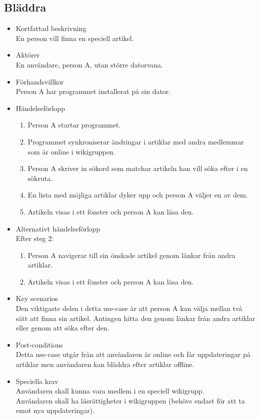 \subsection{Bläddra}
\begin{itemize}
	\item Kortfattad beskrivning
	\\En person vill finna en speciell artikel.
	\item Aktörer
	\\En användare, person A, utan större datorvana.
	\item Förhandsvillkor
	\\Person A har programmet installerat på sin dator.
	\item Händelseförlopp
	\begin{enumerate}
		\item Person A startar programmet.
		\item Programmet synkroniserar ändringar i artiklar med andra medlemmar som är online i wikigruppen.
		\item Person A skriver in sökord som matchar artikeln han vill söka efter i en sökruta.
		\item En lista med möjliga artiklar dyker upp och person A väljer en av dem.
		\item Artikeln visas i ett fönster och person A kan läsa den.
	\end{enumerate}
	\item Alternativt händelseförlopp
	\\Efter steg 2:
	\begin{enumerate}
		\item Person A navigerar till sin önskade artikel genom länkar från andra artiklar.	
		\item Artikeln visas i ett fönster och person A kan läsa den.
	\end{enumerate}	
	\item Key scenarios
	\\Den viktigaste delen i detta use-case är att person A kan välja mellan två sätt att finna sin artikel. Antingen hitta den genom länkar från andra artiklar eller genom att söka efter den.
	\item Post-conditions
	\\Detta use-case utgår från att användaren är online och får uppdateringar på artiklar men användaren kan bläddra efter artiklar offline.
	\item Speciella krav
	\\ Användaren skall kunna vara medlem i en speciell wikigrupp.
	\\ Användaren skall ha läsrättigheter i wikigruppen (behövs endast för att ta emot nya uppdateringar).
\end{itemize}

